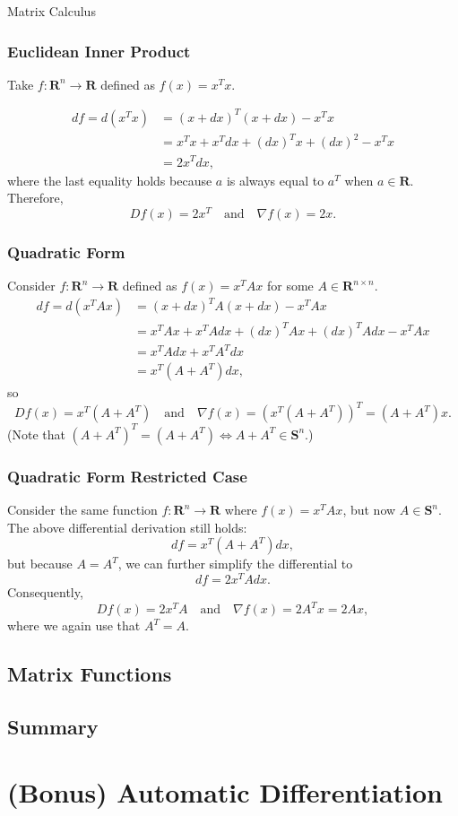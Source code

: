\begin{chapter}{Matrix Calculus}
    \subsubsection*{Euclidean Inner Product}
    Take $f: \mathbf{R}^n \to \mathbf{R}$ defined as $f(x) = x^T x$.

    \[\begin{aligned}
        df = d(x^T x) &= (x + dx)^T (x + dx) - x^T x \\
        &= x^T x + x^T dx + (dx)^T x + (dx)^2 - x^Tx \\
        &= 2x^T dx,
    \end{aligned}\]
    where the last equality holds because $a$ is always equal to $a^T$ when $a \in \mathbf{R}$. 
    Therefore,
    \[Df(x) = 2x^T \quad \text{and} \quad \nabla f(x) = 2x.\]

    \subsubsection*{Quadratic Form}
    Consider $f: \mathbf{R}^n \to \mathbf{R}$ defined as $f(x) = x^T A x$ for some $A \in \mathbf{R}^{n \times n}$.
    \[\begin{aligned}
        df = d(x^TAx) &= (x + dx)^T A (x + dx) - x^T A x \\
        &= x^T A x + x^T A dx + (dx)^TAx + (dx)^T A dx - x^T A x \\
        &= x^T A dx + x^TA^Tdx \\
        &= x^T(A + A^T)dx,
    \end{aligned}\]
    so 
    \[Df(x) = x^T(A + A^T) \quad \text{and} \quad \nabla f(x) = \left(x^T(A + A^T) \right)^T = (A + A^T)x.\]
    (Note that $(A + A^T)^T = (A + A^T) \Leftrightarrow A + A^T \in \mathbf{S}^{n}$.)

    \subsubsection{Quadratic Form Restricted Case}
    Consider the same function $f: \mathbf{R}^n \to \mathbf{R}$ where $f(x) = x^T A x$, but now
    $A \in \textbf{S}^{n}$. The above differential derivation still holds:
    \[df = x^T(A + A^T)dx,\]
    but because $A = A^T$, we can further simplify the differential to
    \[df = 2x^T A dx.\]
    Consequently,
    \[Df(x) = 2x^T A \quad \text{and} \quad \nabla f(x) = 2A^Tx = 2Ax,\]
    where we again use that $A^T = A$.
    \noindent 

    \subsection{Matrix Functions}

    \subsection{Summary}

    \section{(Bonus) Automatic Differentiation}
    
    
\end{chapter}